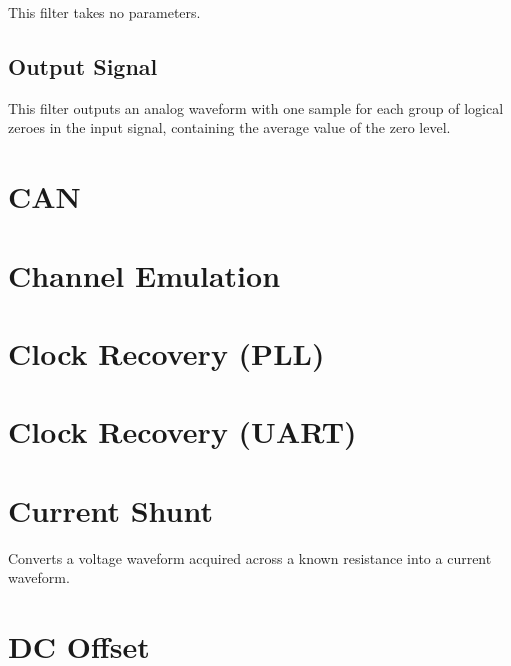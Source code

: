 This filter takes no parameters.

\subsection{Output Signal}

This filter outputs an analog waveform with one sample for each group of logical zeroes in the input signal, containing
the average value of the zero level.

\pagebreak
\section{CAN}

\pagebreak
\section{Channel Emulation}

\pagebreak
\section{Clock Recovery (PLL)}
\label{filter:cdrpll}

\pagebreak
\section{Clock Recovery (UART)}

\pagebreak
\section{Current Shunt}

Converts a voltage waveform acquired across a known resistance into a current waveform.

\pagebreak
\section{DC Offset}

